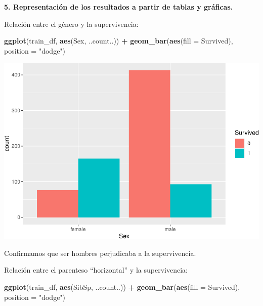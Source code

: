 \documentclass[]{article}
\newenvironment{Shaded}{\begin{snugshade}}{\end{snugshade}}
\newcommand{\DataTypeTok}[1]{\textcolor[rgb]{0.13,0.29,0.53}{#1}}
\newcommand{\KeywordTok}[1]{\textcolor[rgb]{0.13,0.29,0.53}{\textbf{#1}}}
\newcommand{\NormalTok}[1]{#1}
\newcommand{\OperatorTok}[1]{\textcolor[rgb]{0.81,0.36,0.00}{\textbf{#1}}}
\newcommand{\StringTok}[1]{\textcolor[rgb]{0.31,0.60,0.02}{#1}}
\begin{document}
\textbf{5. Representación de los resultados a partir de tablas y
gráficas.}

Relación entre el género y la supervivencia:

\begin{Shaded}
\begin{Highlighting}[]
\KeywordTok{ggplot}\NormalTok{(train_df, }\KeywordTok{aes}\NormalTok{(Sex, ..count..)) }\OperatorTok{+}\StringTok{ }\KeywordTok{geom_bar}\NormalTok{(}\KeywordTok{aes}\NormalTok{(}\DataTypeTok{fill =}\NormalTok{ Survived), }\DataTypeTok{position =} \StringTok{"dodge"}\NormalTok{)}
\end{Highlighting}
\end{Shaded}

\includegraphics{titanic_data_analysis_PRA2_files/figure-latex/unnamed-chunk-28-1.pdf}

Confirmamos que ser hombres perjudicaba a la supervivencia.

Relación entre el parenteso ``horizontal'' y la supervivencia:

\begin{Shaded}
\begin{Highlighting}[]
\KeywordTok{ggplot}\NormalTok{(train_df, }\KeywordTok{aes}\NormalTok{(SibSp, ..count..)) }\OperatorTok{+}\StringTok{ }\KeywordTok{geom_bar}\NormalTok{(}\KeywordTok{aes}\NormalTok{(}\DataTypeTok{fill =}\NormalTok{ Survived), }\DataTypeTok{position =} \StringTok{"dodge"}\NormalTok{)}
\end{Highlighting}
\end{Shaded}
\end{document}

